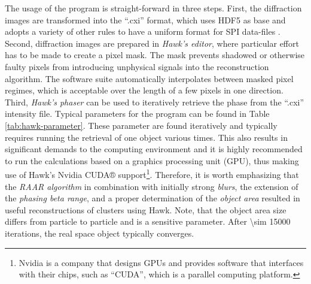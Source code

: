 The usage of the program is straight-forward in three steps. First, the diffraction images are transformed into the ``.cxi'' format, which uses HDF5 as base and adopts a variety of other rules to have a uniform format for SPI data-files \citep{Maia-2012-NatMet}. Second, diffraction images are prepared in \textit{Hawk's editor}, where particular effort has to be made to create a pixel mask. The mask prevents shadowed or otherwise faulty pixels from introducing unphysical signals into the reconstruction algorithm. The software suite automatically interpolates between masked pixel regimes, which is acceptable over the length of a few pixels in one direction. Third, \textit{Hawk's phaser} can be used to iteratively retrieve the phase from the ``.cxi'' intensity file. Typical parameters for the program can be found in Table \ref{tab:hawk-parameter}. These parameter are found iteratively and typically requires running the retrieval of one object various times. This also results in significant demands to the computing environment and it is highly recommended to run the calculations based on a graphics processing unit (GPU), thus making use of Hawk's Nvidia CUDA® support\footnote{Nvidia is a company that designs GPUs and provides software that interfaces with their chips, such as ``CUDA'', which is a parallel computing platform.}. Therefore, it is worth emphasizing that the \textit{RAAR algorithm} \cite{Luke-2005-IP} in combination with initially strong \textit{blurs}, the extension of the \textit{phasing beta range}, and a proper determination of the \textit{object area} resulted in useful reconstructions of clusters using Hawk. Note, that the object area size differs from particle to particle and is a sensitive parameter. After \num[fixed-exponent=0]{\sim 15000} iterations, the real space object typically converges.
%
%
%
